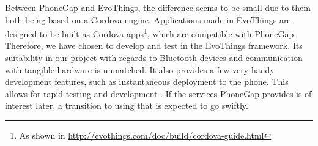 Between PhoneGap and EvoThings, the difference seems to be small due to them both being based on a Cordova engine. Applications made in EvoThings are designed to be built as Cordova apps\footnote{As shown in \href{http://evothings.com/doc/build/cordova-guide.html}{http://evothings.com/doc/build/cordova-guide.html}}, which are compatible with PhoneGap. Therefore, we have chosen to develop and test in the EvoThings framework. Its suitability in our project with regards to Bluetooth devices and communication with tangible hardware is unmatched. It also provides a few very handy development features, such as instantaneous deployment to the phone. This allows for rapid testing and development .
If the services PhoneGap provides is of interest later, a transition to using that is expected to go swiftly.


